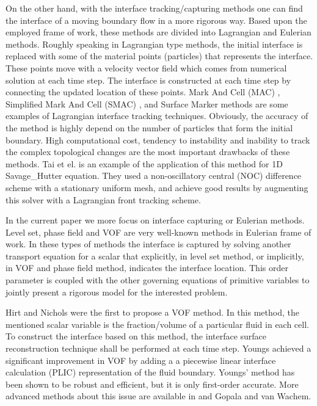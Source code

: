 \documentclass[letterpaper,10pt]{article}
\begin{document}
On the other hand, with the interface tracking/capturing methods one can find the interface of a moving boundary flow in a more rigorous way. Based upon the employed frame of work, these methods are divided into Lagrangian and Eulerian methods.
Roughly speaking in Lagrangian type methods, the initial interface is replaced with some of the material points (particles) that represents the interface. These points move with a velocity vector field which comes from numerical solution at each time step. The interface is constructed at each time step by connecting the updated location of these points. 
Mark And Cell (MAC) \cite{Harlow1965}, Simplified Mark And Cell (SMAC)  \cite{Cheng1995}, and Surface Marker \citep{Wrobel1991} methods are some examples of Lagrangian interface tracking techniques.
Obviously, the accuracy of the method is highly depend on the number 
of particles that form the initial boundary. 
High computational cost, tendency to instability and inability to track the complex topological changes are the most important drawbacks of these methods. 
Tai et el. \cite{Tai2002} is an example of the application of this method for 1D Savage\_Hutter equation. They used a non-oscillatory central (NOC) difference scheme with a stationary uniform mesh, and achieve good results by augmenting this solver with a Lagrangian front tracking scheme.\newline

In the current paper we more focus on interface capturing or Eulerian methods. Level set, phase field and VOF are very well-known methods in Eulerian frame of work.
In these types of methods the interface is captured by solving another transport equation for a scalar that explicitly, in level set method, or implicitly, in VOF and phase field method, indicates the interface location.
This order parameter is coupled with the other governing equations of primitive variables to jointly present a rigorous model for the interested problem.\newline



Hirt and Nichols \cite{hirt1981vfv} were the first to propose a VOF method. 
In this method, the mentioned scalar variable is the fraction/volume of a particular fluid in each cell.
To construct the interface based on this method, the interface surface reconstruction technique shall be performed at each time step. Youngs \cite{youngs1982tdm} achieved a significant improvement in VOF by adding a 
a piecewise linear interface calculation (PLIC) representation of the fluid boundary.  
Youngs' method has been shown to be robust and efficient, but it is only first-order accurate. More advanced methods about this issue are available in \cite{gerlach2006cvf} and Gopala and van Wachem\cite{gopala2008vfm}. 
\end{document}

